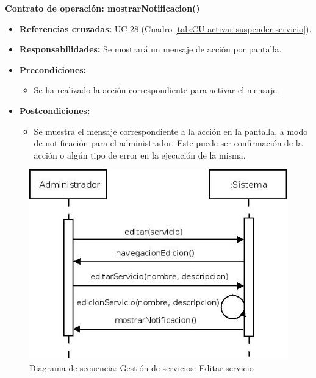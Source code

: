 \textbf{Contrato de operación: mostrarNotificacion()}
\begin{itemize}
\item \textbf{Referencias cruzadas:} UC-28 (Cuadro \ref{tab:CU-activar-suspender-servicio}).
\item \textbf{Responsabilidades:} Se mostrará un mensaje de acción por pantalla.
\item \textbf{Precondiciones:} 
 \begin{itemize}
\item Se ha realizado la acción correspondiente para activar el mensaje.
\end {itemize}
\item \textbf{Postcondiciones:} 
 \begin{itemize}
\item Se muestra el mensaje correspondiente a la acción en la pantalla, a modo de notificación para el administrador. Este puede ser confirmación de la acción o algún tipo de error en la ejecución de la misma.
\end {itemize}
\end {itemize}


\vspace{10mm}

\begin{figure}[H]
\centering
  \includegraphics[scale=.55]{img/secuencias/gestion-servicios-editar-servicio.jpeg}
  \caption{Diagrama de secuencia: Gestión de servicios: Editar servicio}
  \label{fig:secuencia-gestion-servicios-editar-servicio}
\end{figure}

